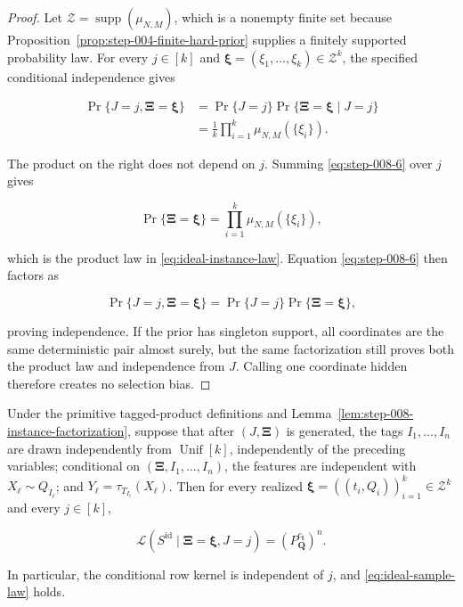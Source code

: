 \begin{proof}
Let \(\mathcal Z=\operatorname{supp}(\mu_{N,M})\), which is a nonempty
finite set because Proposition~\ref{prop:step-004-finite-hard-prior}
supplies a finitely supported
probability law. For every \(j\in[k]\) and
\(\boldsymbol\xi=(\xi_1,\ldots,\xi_k)\in\mathcal Z^k\), the specified
conditional independence gives

\[
\begin{aligned}
\Pr\{J=j,\boldsymbol\Xi=\boldsymbol\xi\}
&=\Pr\{J=j\}
  \Pr\{\boldsymbol\Xi=\boldsymbol\xi\mid J=j\}\\
&=\frac1k\prod_{i=1}^k\mu_{N,M}(\{\xi_i\}).
\end{aligned}
\tag{S8.6}\label{eq:step-008-6}
\]

The product on the right does not depend on \(j\). Summing \eqref{eq:step-008-6} over
\(j\) gives

\[
\Pr\{\boldsymbol\Xi=\boldsymbol\xi\}
=\prod_{i=1}^k\mu_{N,M}(\{\xi_i\}),
\]

which is the product law in \eqref{eq:ideal-instance-law}. Equation \eqref{eq:step-008-6} then factors as

\[
\Pr\{J=j,\boldsymbol\Xi=\boldsymbol\xi\}
=\Pr\{J=j\}\Pr\{\boldsymbol\Xi=\boldsymbol\xi\},
\]

proving independence. If the prior has singleton support, all coordinates
are the same deterministic pair almost surely, but the same factorization
still proves both the product law and independence from \(J\). Calling one
coordinate hidden therefore creates no selection bias. \end{proof}

\begin{lemma}\label{lem:step-008-ideal-sample-law}
Under the primitive tagged-product definitions and
Lemma~\ref{lem:step-008-instance-factorization}, suppose that after
\((J,\boldsymbol\Xi)\) is generated, the tags
\(I_1,\ldots,I_n\) are drawn independently from
\(\operatorname{Unif}[k]\), independently of the preceding variables;
conditional on \((\boldsymbol\Xi,I_1,\ldots,I_n)\), the features are
independent with \(X_\ell\sim Q_{I_\ell}\); and
\(Y_\ell=\tau_{T_{I_\ell}}(X_\ell)\). Then for every realized
\(\boldsymbol\xi=((t_i,Q_i))_{i=1}^k\in\mathcal Z^k\) and every
\(j\in[k]\),

\[
\mathcal L\!\left(S^{\mathrm{id}}\mid
  \boldsymbol\Xi=\boldsymbol\xi,J=j\right)
=\left(P_{\boldsymbol Q}^{c_{\boldsymbol t}}\right)^n.
\tag{S8.7}\label{eq:step-008-7}
\]

In particular, the conditional row kernel is independent of \(j\), and \eqref{eq:ideal-sample-law}
holds.
\end{lemma}

